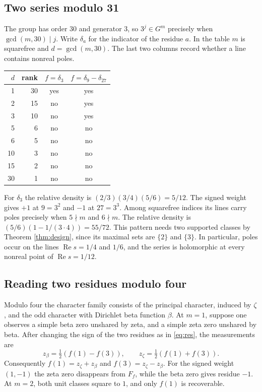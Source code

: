 \documentclass[11pt,letterpaper]{article}
\newcommand{\re}{\operatorname{Re}}\newcommand{\e}{\mathrm e}\newcommand{\dd}{\,\mathrm d}
\begin{document}
\subsection*{Two series modulo 31}
The group has order $30$ and generator $3$, so $3^j\in G^m$ precisely when $\gcd(m,30)\mid j$. Write $\delta_a$ for the indicator of the residue $a$. In the table $m$ is squarefree and $d=\gcd(m,30)$. The last two columns record whether a line contains nonreal poles.
\begin{center}
\begin{tabular}{r r c c}
\toprule
$d$ & rank & $f=\delta_3$ & $f=\delta_9-\delta_{27}$ \\
\midrule
1 &30&yes&yes\\
2 &15&no&yes\\
3 &10&no&yes\\
5 &6&no&no\\
6 &5&no&no\\
10&3&no&no\\
15&2&no&no\\
30&1&no&no\\
\bottomrule
\end{tabular}
\end{center}
For $\delta_3$ the relative density is $(2/3)(3/4)(5/6)=5/12$. The signed weight gives $+1$ at $9=3^2$ and $-1$ at $27=3^3$. Among squarefree indices its lines carry poles precisely when $5\nmid m$ and $6\nmid m$. The relative density is $(5/6)(1-1/(3\cdot4))=55/72$. This pattern needs two supported classes by Theorem \ref{thm:design}, since its maximal sets are $\{2\}$ and $\{3\}$. In particular, poles occur on the lines $\re s=1/4$ and $1/6$, and the series is holomorphic at every nonreal point of $\re s=1/12$.

\subsection*{Reading two residues modulo four}
Modulo four the character family consists of the principal character, induced by $\zeta$, and the odd character with Dirichlet beta function $\beta$. At $m=1$, suppose one observes a simple beta zero unshared by zeta, and a simple zeta zero unshared by beta. After changing the sign of the two residues as in \eqref{eq:res}, the measurements are
\[
 z_\beta=\tfrac12(f(1)-f(3)),\qquad z_\zeta=\tfrac12(f(1)+f(3)).
\]
Consequently $f(1)=z_\zeta+z_\beta$ and $f(3)=z_\zeta-z_\beta$. For the signed weight $(1,-1)$ the zeta zero disappears from $F_f$, while the beta zero gives residue $-1$. At $m=2$, both unit classes square to $1$, and only $f(1)$ is recoverable.
\end{document}
